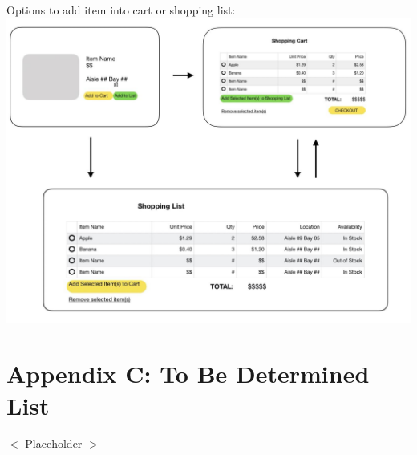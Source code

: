 \documentclass{scrreprt}
\begin{document}
Options to add item into cart or shopping list:\\
	\includegraphics[width=6 in]{4.jpg}

\section{Appendix C: To Be Determined List}
$<$ Placeholder $>$
\end{document}
